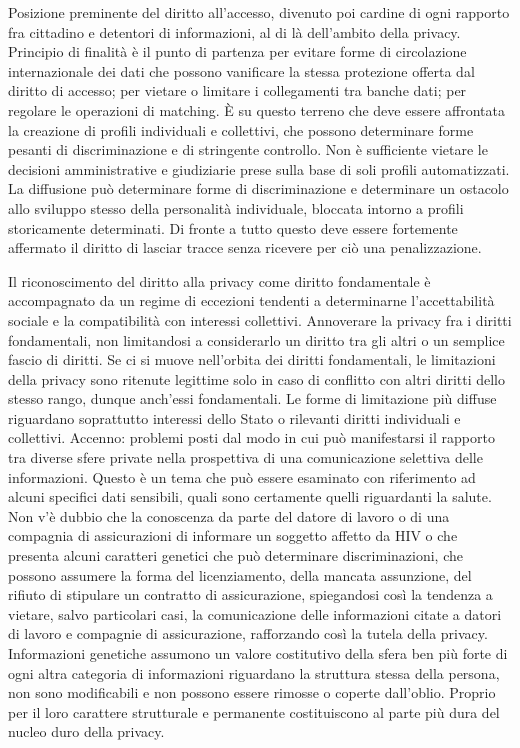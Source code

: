 Posizione preminente del diritto all’accesso, divenuto poi cardine di ogni rapporto fra cittadino e detentori di informazioni, al di là dell’ambito della privacy.
Principio di finalità è il punto di partenza per evitare forme di circolazione internazionale dei dati che possono vanificare la stessa protezione offerta dal diritto di accesso; per vietare o limitare i collegamenti tra banche dati; per regolare le operazioni di matching.
È su questo terreno che deve essere affrontata la creazione di profili individuali e collettivi, che possono determinare forme pesanti di discriminazione e di stringente controllo. Non è sufficiente vietare le decisioni amministrative e giudiziarie prese sulla base di soli profili automatizzati. La diffusione può determinare forme di discriminazione e determinare un ostacolo allo sviluppo stesso della personalità individuale, bloccata intorno a profili storicamente determinati. Di fronte a tutto questo deve essere fortemente affermato il diritto di lasciar tracce senza ricevere per ciò una penalizzazione.

Il riconoscimento del diritto alla privacy come diritto fondamentale è accompagnato da un regime di eccezioni tendenti a determinarne l’accettabilità sociale e la compatibilità con interessi collettivi.
Annoverare la privacy fra i diritti fondamentali, non limitandosi a considerarlo un diritto tra gli altri o un semplice fascio di diritti. Se ci si muove nell’orbita dei diritti fondamentali, le limitazioni della privacy sono ritenute legittime solo in caso di conflitto con altri diritti dello stesso rango, dunque anch’essi fondamentali.
Le forme di limitazione più diffuse riguardano soprattutto interessi dello Stato o rilevanti diritti individuali e collettivi.
Accenno: problemi posti dal modo in cui può manifestarsi il rapporto tra diverse sfere private nella prospettiva di una comunicazione selettiva delle informazioni. Questo è un tema che può essere esaminato con riferimento ad alcuni specifici dati sensibili, quali sono certamente quelli riguardanti la salute. Non v’è dubbio che la conoscenza da parte del datore di lavoro o di una compagnia di assicurazioni di informare un soggetto affetto da HIV o che presenta alcuni caratteri genetici che può determinare discriminazioni, che possono assumere la forma del licenziamento, della mancata assunzione, del rifiuto di stipulare un contratto di assicurazione, spiegandosi così la tendenza a vietare, salvo particolari casi, la comunicazione delle informazioni citate a datori di lavoro e compagnie di assicurazione, rafforzando così la tutela della privacy.
Informazioni genetiche assumono un valore costitutivo della sfera ben più forte di ogni altra categoria di informazioni riguardano la struttura stessa della persona, non sono modificabili e non possono essere rimosse o coperte dall’oblio. Proprio per il loro carattere strutturale e permanente costituiscono al parte più dura del nucleo duro della privacy.

